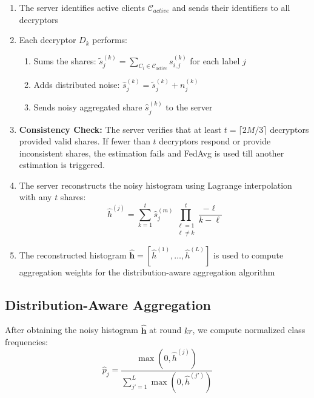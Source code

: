 \documentclass[runningheads]{llncs}
\begin{document}
\begin{enumerate}
    \item The server identifies active clients $\mathcal{C}_{active}$ and sends their identifiers to all decryptors
    
    \item Each decryptor $D_k$ performs:
    \begin{enumerate}
        \item Sums the shares: $\tilde{s}_j^{(k)} = \sum_{C_i \in \mathcal{C}_{active}} s_{i,j}^{(k)}$ for each label $j$
        \item Adds distributed noise: $\hat{s}_j^{(k)} = \tilde{s}_j^{(k)} + n_j^{(k)}$
        \item Sends noisy aggregated share $\hat{s}_j^{(k)}$ to the server
    \end{enumerate}
    
    \item \textbf{Consistency Check:} The server verifies that at least $t = \lceil 2M/3 \rceil$ decryptors provided valid shares. If fewer than $t$ decryptors respond or provide inconsistent shares, the estimation fails and FedAvg is used till another estimation is triggered.
    
    \item The server reconstructs the noisy histogram using Lagrange interpolation with any $t$ shares:
    \begin{equation}
        \hat{h}^{(j)} = \sum_{k=1}^{t} \hat{s}_j^{(m)} \prod_{\substack{\ell=1 \\ \ell \neq k}}^{t} \frac{-\ell}{k - \ell}
    \end{equation}
    
    \item The reconstructed histogram $\hat{\mathbf{h}} = [\hat{h}^{(1)}, \ldots, \hat{h}^{(L)}]$ is used to compute aggregation weights for the distribution-aware aggregation algorithm
\end{enumerate}

\subsection{Distribution-Aware Aggregation}

After obtaining the noisy histogram $\hat{\mathbf{h}}$ at round $kr$, we compute normalized class frequencies:
\begin{equation}
    \hat{p}_j = \frac{\max(0, \hat{h}^{(j)})}{\sum_{j'=1}^{L} \max(0, \hat{h}^{(j')})}
\end{equation}
\end{document}
